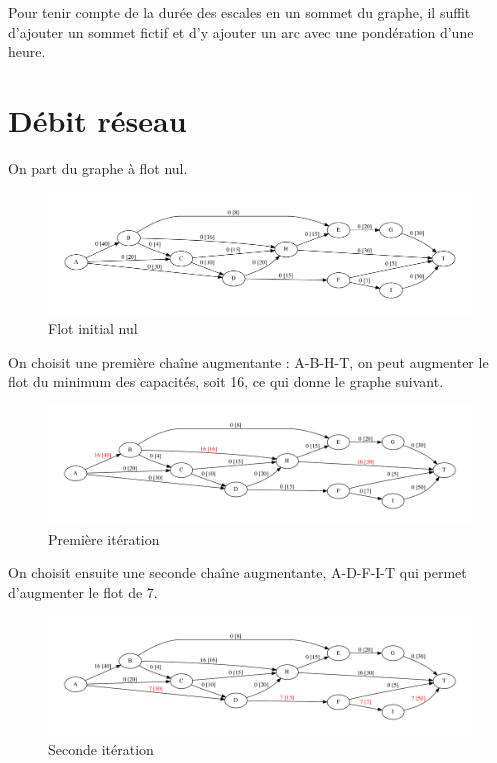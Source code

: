 \documentclass[paper=a4, fontsize=11pt]{scrartcl} %
\numberwithin{equation}{section} %
\numberwithin{figure}{section} %
\numberwithin{table}{section} %
\begin{document}
Pour tenir compte de la durée des escales en un sommet du graphe, il suffit d'ajouter un sommet fictif et d'y ajouter un arc avec une pondération d'une heure. 

\section{Débit réseau}

On part du graphe à flot nul. 


\begin{figure}[h]
\begin{center}
	\includegraphics[width=\textwidth]{figs/reseau.pdf}
	\caption{Flot initial nul}
	\label{fig:res:0}
\end{center}
\end{figure}

On choisit une première chaîne augmentante : A-B-H-T, on peut augmenter le flot du minimum des capacités, soit 16, ce qui donne le graphe suivant.

\begin{figure}[h]
\begin{center}
	\includegraphics[width=\textwidth]{figs/reseau-1.pdf}
	\caption{Première itération}
	\label{fig:res:1}
\end{center}
\end{figure}

On choisit ensuite une seconde chaîne augmentante, A-D-F-I-T qui permet d'augmenter le flot de 7.

\begin{figure}[h]
\begin{center}
	\includegraphics[width=\textwidth]{figs/reseau-2.pdf}
	\caption{Seconde itération}
	\label{fig:res:2}
\end{center}
\end{figure}
\end{document}
